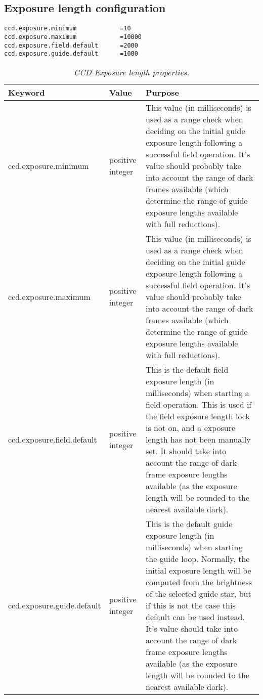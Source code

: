 \documentclass[10pt,a4paper]{article}
\begin{document}
\subsection{Exposure length configuration}

\begin{verbatim}
ccd.exposure.minimum			=10
ccd.exposure.maximum			=10000
ccd.exposure.field.default		=2000
ccd.exposure.guide.default		=1000
\end{verbatim}

\begin{table}[!h]
\begin{center}
\begin{tabular}{|l|l|p{20em}|}
\hline
{\bf Keyword}                & {\bf Value} & {\bf Purpose} \\ \hline
ccd.exposure.minimum       & positive integer & This value (in milliseconds) is used as a range check when deciding on the initial guide exposure length following a successful field operation. It's value should probably take into account the range of dark frames available (which determine the range of guide exposure lengths available with full reductions). \\ \hline
ccd.exposure.maximum       & positive integer & This value (in milliseconds) is used as a range check when deciding on the initial guide exposure length following a successful field operation. It's value should probably take into account the range of dark frames available (which determine the range of guide exposure lengths available with full reductions).\\ \hline
ccd.exposure.field.default & positive integer & This is the default field exposure length (in milliseconds) when starting a field operation. This is used if the field exposure length lock is not on, and a exposure length has not been manually set. It should take into account the range of dark frame exposure lengths available (as the exposure length will be rounded to the nearest available dark). \\ \hline
ccd.exposure.guide.default & positive integer & This is the default guide exposure length (in milliseconds) when starting the guide loop. Normally, the initial exposure length will be computed from the brightness of the selected guide star, but if this is not the case this default can be used instead. It's value should take into account the range of dark frame exposure lengths available (as the exposure length will be rounded to the nearest available dark). \\ \hline
\end{tabular}
\end{center}
\caption{\em CCD Exposure length properties.}
\label{tab:ccdexposurelengthproperties}
\end{table}
\end{document}
